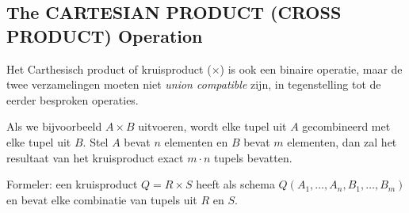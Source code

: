 \subsection{The CARTESIAN PRODUCT (CROSS PRODUCT) Operation}
Het Carthesisch product of kruisproduct ($\times$) is ook een binaire operatie, maar de twee verzamelingen moeten niet \textit{union compatible} zijn, in tegenstelling tot de eerder besproken operaties.

Als we bijvoorbeeld $A \times B$ uitvoeren, wordt elke tupel uit $A$ gecombineerd met elke tupel uit $B$. Stel $A$ bevat $n$ elementen en $B$ bevat $m$ elementen, dan zal het resultaat van het kruisproduct exact $m \cdot n$ tupels bevatten.

Formeler: een kruisproduct $Q = R \times S$ heeft als schema $Q(A_1, \dots, A_n, B_1, \dots, B_m)$ en bevat elke combinatie van tupels uit $R$ en $S$.

~

